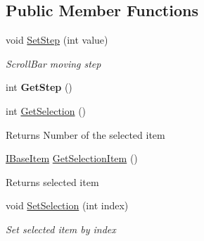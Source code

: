 \subsection*{Public Member Functions}
\begin{DoxyCompactItemize}
\item 
void \mbox{\hyperlink{class_space_v_i_l_1_1_list_area_a4092a62f4f548a9289632a91cd8d452a}{Set\+Step}} (int value)
\begin{DoxyCompactList}\small\item\em Scroll\+Bar moving step \end{DoxyCompactList}\item 
\mbox{\label{class_space_v_i_l_1_1_list_area_ad4b98361d3921da08ec168b2638c5031}} 
int {\bfseries Get\+Step} ()
\item 
\mbox{\label{class_space_v_i_l_1_1_list_area_a07991a67811d7341bde2968f4703f139}} 
int \mbox{\hyperlink{class_space_v_i_l_1_1_list_area_a07991a67811d7341bde2968f4703f139}{Get\+Selection}} ()
\begin{DoxyCompactList}\small\item\em \begin{DoxyReturn}{Returns}
Number of the selected item 
\end{DoxyReturn}
\end{DoxyCompactList}\item 
\mbox{\label{class_space_v_i_l_1_1_list_area_a365f9d965afdee8da578de16dc6f7e83}} 
\mbox{\hyperlink{interface_space_v_i_l_1_1_core_1_1_i_base_item}{I\+Base\+Item}} \mbox{\hyperlink{class_space_v_i_l_1_1_list_area_a365f9d965afdee8da578de16dc6f7e83}{Get\+Selection\+Item}} ()
\begin{DoxyCompactList}\small\item\em \begin{DoxyReturn}{Returns}
selected item 
\end{DoxyReturn}
\end{DoxyCompactList}\item 
void \mbox{\hyperlink{class_space_v_i_l_1_1_list_area_a4a0e42a96f357bf2f0c58731ade71ffd}{Set\+Selection}} (int index)
\begin{DoxyCompactList}\small\item\em Set selected item by index \end{DoxyCompactList}\item 

\end{DoxyCompactItemize}

